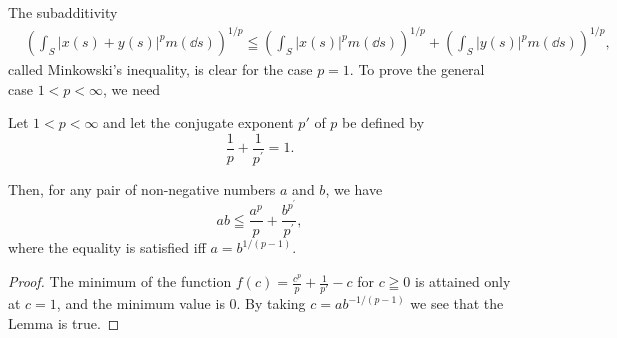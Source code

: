 The subadditivity 
\begin{equation}\label{eq:I.3.2}
\begin{aligned}
&\left(\int_{S} | x (s) + y (s) | ^{p} m (\dd s)\right) ^{1/p}  \leqq \left(\int_{S} | x (s) | ^{p} m (\dd s)\right) ^{1/p} + \left(\int_{S} | y (s) | ^{p} m (\dd s)\right) ^{1/p},
\end{aligned}
\end{equation}
called Minkowski's inequality, is clear for the case $p = 1$. To prove the general case $1 < p < \infty$, we need 

\begin{lemma}\label{lem:I.3.Lemma.1} Let $1 < p < \infty$ and let the conjugate exponent $p'$ of $p$ be defined by 
\begin{equation}\label{eq:I.3.3}
\frac {1}{p} + \frac {1}{p^{\prime}} = 1.
\end{equation}
\end{lemma}

Then, for any pair of non-negative numbers $a$ and $b$, we have 
\begin{equation}\label{eq:I.3.4}
a b \leqq \frac {a ^{p}}{p} + \frac {b ^ {p^{\prime}}}{p^{\prime}},
\end{equation}
where the equality is satisfied iff $a = b^{1/(p-1)}$. 

\begin{proof}
 The minimum of the function $f(c) = \frac{c^p}{p} + \frac{1}{p'}- c$ for $c \geqq 0$ is attained only at $c = 1$, and the minimum value is $0$. By taking $c = ab^{-1/(p-1)}$ we see that the Lemma is true. 
\end{proof}

